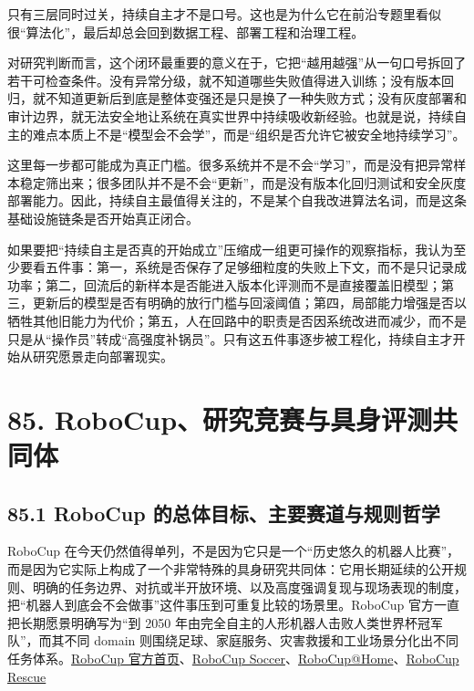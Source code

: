 只有三层同时过关，持续自主才不是口号。这也是为什么它在前沿专题里看似很“算法化”，最后却总会回到数据工程、部署工程和治理工程。

对研究判断而言，这个闭环最重要的意义在于，它把“越用越强”从一句口号拆回了若干可检查条件。没有异常分级，就不知道哪些失败值得进入训练；没有版本回归，就不知道更新后到底是整体变强还是只是换了一种失败方式；没有灰度部署和审计边界，就无法安全地让系统在真实世界中持续吸收新经验。也就是说，持续自主的难点本质上不是“模型会不会学”，而是“组织是否允许它被安全地持续学习”。

这里每一步都可能成为真正门槛。很多系统并不是不会“学习”，而是没有把异常样本稳定筛出来；很多团队并不是不会“更新”，而是没有版本化回归测试和安全灰度部署能力。因此，持续自主最值得关注的，不是某个自我改进算法名词，而是这条基础设施链条是否开始真正闭合。

如果要把“持续自主是否真的开始成立”压缩成一组更可操作的观察指标，我认为至少要看五件事：第一，系统是否保存了足够细粒度的失败上下文，而不是只记录成功率；第二，回流后的新样本是否能进入版本化评测而不是直接覆盖旧模型；第三，更新后的模型是否有明确的放行门槛与回滚阈值；第四，局部能力增强是否以牺牲其他旧能力为代价；第五，人在回路中的职责是否因系统改进而减少，而不是只是从“操作员”转成“高强度补锅员”。只有这五件事逐步被工程化，持续自主才开始从研究愿景走向部署现实。

\chapter*{85. RoboCup、研究竞赛与具身评测共同体}

\section*{85.1 RoboCup 的总体目标、主要赛道与规则哲学}


RoboCup 在今天仍然值得单列，不是因为它只是一个“历史悠久的机器人比赛”，而是因为它实际上构成了一个非常特殊的具身研究共同体：它用长期延续的公开规则、明确的任务边界、对抗或半开放环境、以及高度强调复现与现场表现的制度，把“机器人到底会不会做事”这件事压到可重复比较的场景里。RoboCup 官方一直把长期愿景明确写为“到 2050 年由完全自主的人形机器人击败人类世界杯冠军队”，而其不同 domain 则围绕足球、家庭服务、灾害救援和工业场景分化出不同任务体系。\href{https://www.robocup.org/}{RoboCup 官方首页}、\href{https://www.robocup.org/domains/1}{RoboCup Soccer}、\href{https://athome.robocup.org/}{RoboCup@Home}、\href{https://www.robocup.org/domains/2}{RoboCup Rescue}

